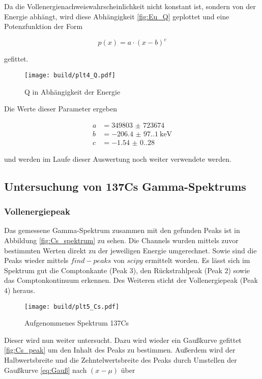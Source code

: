 Da die Vollenergienachweiswahrscheinlichkeit nicht konstant ist, sondern von
der Energie abhängt, wird diese Abhängigkeit \eqref{fig:Eu_Q} geplottet und
eine Potenzfunktion der Form

\begin{equation}
	p(x)=a \cdot (x-b)^c
\end{equation}

gefittet.

\begin{figure}[H]
	\centering
	\texttt{[image: build/plt4\_Q.pdf]}
	\caption{Q in Abhängigkeit der Energie}
	\label{fig:Eu_Q}
\end{figure}

Die Werte dieser Parameter ergeben

\begin{align*}
	a & =\num{349803(723674)}         \\
	b & =\qty{-206.4(97.1)}{\kilo\eV} \\
	c & =\num{-1.54(0.28)}
\end{align*}

und werden im Laufe dieser Auswertung noch weiter verwendete werden.

\subsection{Untersuchung von 137Cs Gamma-Spektrums}
\subsubsection{Vollenergiepeak}
Das gemessene Gamma-Spektrum zusammen mit den gefunden Peaks ist in Abbildung
\eqref{fig:Cs_spektrum} zu sehen. Die Channels wurden mittels zuvor bestimmten
Werten direkt zu der jeweiligen Energie umgerechnet. Sowie sind die Peaks
wieder mittels $find-peaks$ von $scipy$ \cite{scipy} ermittelt worden. Es lässt
sich im Spektrum gut die Comptonkante (Peak $3$), den Rückstrahlpeak (Peak $2$)
sowie das Comptonkontinuum erkennen. Des Weiteren sticht der Vollenergiepeak
(Peak $4$) heraus.

\begin{figure}[H]
	\centering
	\texttt{[image: build/plt5\_Cs.pdf]}
	\caption{Aufgenommenes Spektrum 137Cs}
	\label{fig:Cs_spektrum}
\end{figure}

Dieser wird nun weiter untersucht. Dazu wird wieder ein Gaußkurve gefittet
\eqref{fig:Cs_peak} um den Inhalt des Peaks zu bestimmen. Außerdem wird der
Halbwertsbreite und die Zehntelwertsbreite des Peaks durch Umstellen der
Gaußkurve \eqref{eq:Gauß} nach $(x-\mu)$ über

